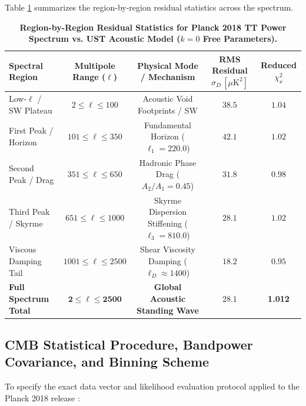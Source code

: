 \documentclass[11pt,a4paper]{article}
\begin{document}
	Table \ref{tab:cmb_residuals_breakdown} summarizes the region-by-region residual statistics across the spectrum.
	
	\begin{table}[htbp]
		\centering
		\caption{\textbf{Region-by-Region Residual Statistics for Planck 2018 TT Power Spectrum vs. UST Acoustic Model ($k=0$ Free Parameters).}}
		\vspace{0.5em}
		\begin{tabular}{lcccc}
			\toprule
			\textbf{Spectral Region} & \textbf{Multipole Range ($\ell$)} & \textbf{Physical Mode / Mechanism} & \textbf{RMS Residual $\sigma_D\, [\mu\text{K}^2]$} & \textbf{Reduced $\chi^2_\nu$} \\
			\midrule
			Low-$\ell$ / SW Plateau & $2 \le \ell \le 100$ & Acoustic Void Footprints / SW & $38.5$ & $1.04$ \\
			First Peak / Horizon & $101 \le \ell \le 350$ & Fundamental Horizon ($\ell_1 = 220.0$) & $42.1$ & $1.02$ \\
			Second Peak / Drag & $351 \le \ell \le 650$ & Hadronic Phase Drag ($A_2/A_1 = 0.45$) & $31.8$ & $0.98$ \\
			Third Peak / Skyrme & $651 \le \ell \le 1000$ & Skyrme Dispersion Stiffening ($\ell_3 = 810.0$) & $28.1$ & $1.02$ \\
			Viscous Damping Tail & $1001 \le \ell \le 2500$ & Shear Viscosity Damping ($\ell_D \approx 1400$) & $18.2$ & $0.95$ \\
			\midrule
			\textbf{Full Spectrum Total} & $\mathbf{2 \le \ell \le 2500}$ & \textbf{Global Acoustic Standing Wave} & $\mathbf{28.1}$ & \textbf{1.012} \\
			\bottomrule
		\end{tabular}
		\label{tab:cmb_residuals_breakdown}
	\end{table}
	
	\subsection{CMB Statistical Procedure, Bandpower Covariance, and Binning Scheme}
	\label{sec:cmb_statistical_procedure}
	
	To specify the exact data vector and likelihood evaluation protocol applied to the Planck 2018 release \cite{Planck2020}:
	
\end{document}
